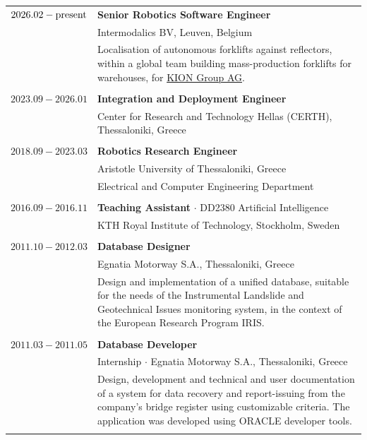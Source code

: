 \documentclass[a4paper,10pt,twoside]{article}
\begin{document}
\begin{tabular}{rp{11cm}}
$2026.02 - \hfill \textnormal{present} \hfill$ & \textbf{Senior Robotics Software Engineer} \\
                                               & Intermodalics BV, Leuven, Belgium\\
& \small{Localisation of autonomous forklifts against reflectors, within a
global team building mass-production forklifts for warehouses,
for \href{https://www.youtube.com/watch?v=LWqDSMOAeec&t=10s}{KION Group AG}.
}\\
&\\
$2023.09 - 2026.01$ & \textbf{Integration and Deployment Engineer} \\
                                                           & Center for Research and Technology Hellas (CERTH), Thessaloniki, Greece\\
&\\
$2018.09 - 2023.03$ & \textbf{Robotics Research Engineer} \\
                    & Aristotle University of Thessaloniki, Greece\\
                    & Electrical and Computer Engineering Department \\
&\\
$2016.09 - 2016.11$ & \textbf{Teaching Assistant} $\cdot$  DD2380 Artificial Intelligence \\
                    & KTH Royal Institute of Technology, Stockholm, Sweden\\
&\\

$2011.10 - 2012.03$ & \textbf{Database Designer} \\
                    & Egnatia Motorway S.A., Thessaloniki, Greece \\
& \small{Design and implementation of a unified database, suitable for the needs of the
Instrumental Landslide and Geotechnical Issues
monitoring system, in the context of the European Research Program IRIS.
}\\
 \\


$2011.03 - 2011.05$ & \textbf{Database Developer} \\
                    & Internship $\cdot$ Egnatia Motorway S.A., Thessaloniki, Greece\\
& \small{Design, development and technical and user documentation of a system for data
recovery and report-issuing from the company's bridge register using
customizable criteria. The application was developed using ORACLE developer tools.
}\\
 \\


\end{tabular}
\end{document}
